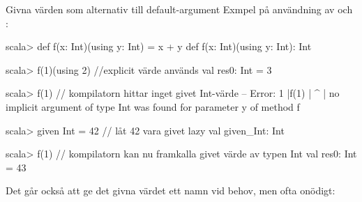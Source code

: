 \begin{Slide}{Givna värden som alternativ till default-argument}\SlideFontSmall
Exmpel på användning av  och :
\begin{REPL}
scala> def f(x: Int)(using y: Int) = x + y
def f(x: Int)(using y: Int): Int

scala> f(1)(using 2)    //explicit värde används
val res0: Int = 3

scala> f(1)        // kompilatorn hittar inget givet Int-värde
-- Error:
1 |f(1)
  |    ^
  |  no implicit argument of type Int was found for parameter y of method f

scala> given Int = 42    // låt 42 vara givet 
lazy val given_Int: Int

scala> f(1)       // kompilatorn kan nu framkalla givet värde av typen Int
val res0: Int = 43
\end{REPL}
Det går också att ge det givna värdet ett namn vid behov, men ofta onödigt:\\
\end{Slide}

